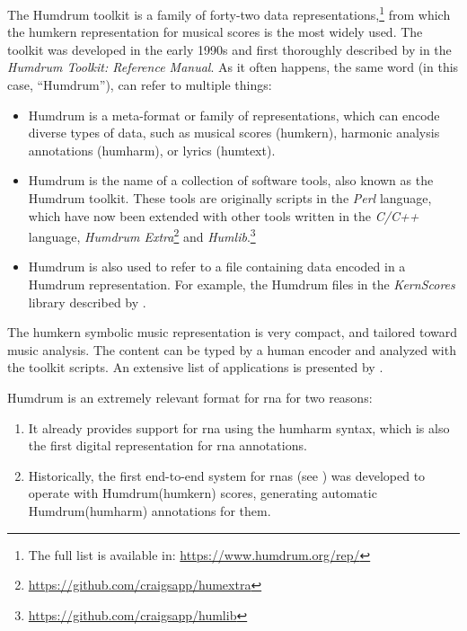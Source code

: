 


The Humdrum toolkit is a family of forty-two data
representations,\footnote{The full list is available in:
\href{https://www.humdrum.org/rep/}{https://www.humdrum.org/rep/}}
from which the \gls{humkern} representation for musical
scores is the most widely used. The toolkit was developed in
the early 1990s and first thoroughly described by
\textcite{huron1994humdrum} in the \emph{Humdrum Toolkit:
Reference Manual}. As it often happens, the same word (in
this case, ``Humdrum''), can refer to multiple things:

\begin{itemize}
    \item Humdrum is a meta-format or family of
    representations, which can encode diverse types of data,
    such as musical scores (\gls{humkern}), harmonic
    analysis annotations (\gls{humharm}), or lyrics
    (\gls{humtext}).
    \item Humdrum is the name of a collection of software
    tools, also known as the Humdrum toolkit. These tools
    are originally scripts in the \emph{Perl} language,
    which have now been extended with other tools written in
    the \emph{C/C++} language, \emph{Humdrum
    Extra}\footnote{\href{https://github.com/craigsapp/humextra}{https://github.com/craigsapp/humextra}}
    and
    \emph{Humlib}.\footnote{\href{https://github.com/craigsapp/humlib}{https://github.com/craigsapp/humlib}}
    \item Humdrum is also used to refer to a file containing
    data encoded in a Humdrum representation. For example,
    the Humdrum files in the \emph{KernScores} library
    described by \textcite{sapp2005online}.
\end{itemize}


The \gls{humkern} symbolic music representation is very
compact, and tailored toward music analysis. The content can
be typed by a human encoder and analyzed with the toolkit
scripts. An extensive list of applications is presented by
\textcite{sapp2011computational}.


Humdrum is an extremely relevant format for \gls{rna} for
two reasons:

\begin{enumerate}
    \item It already provides support for \gls{rna} using
    the \gls{humharm} syntax, which is also the
    first digital representation for \gls{rna} annotations.
    \item Historically, the first end-to-end system for
    \glspl{rna} (see
    ) was developed
    to operate with Humdrum(\gls{humkern}) scores,
    generating automatic Humdrum(\gls{humharm}) annotations
    for them.
\end{enumerate}
